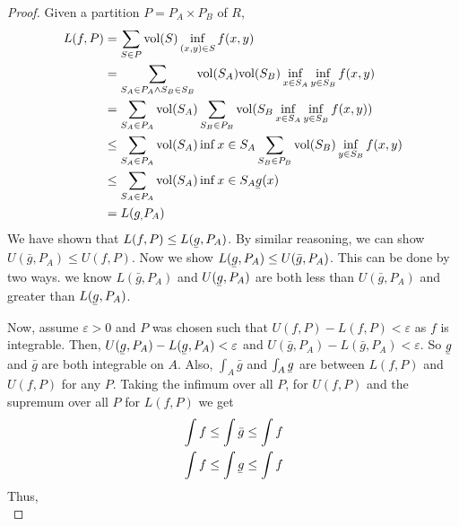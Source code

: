 \documentclass[a4paper]{article}
\newcommand{\ubar}[1]{\underaccent{\bar}{#1}}
\numberwithin{equation}{section}
\newcommand{\vol}{\mathrm{vol}}
\begin{document}
\begin{theorem}[Fubini's]
\begin{proof}
        Given a partition $P=P_A\times P_B$ of $R$,
        \begin{align}
            L(f,P)&=\sum_{S\in P}\vol(S)\inf_{(x,y)\in S}f(x,y)\\
            &=\sum_{S_A\in P_A\land S_B\in S_B} \vol(S_A)\vol(S_B)\inf_{x\in S_A} \inf_{y\in S_B} f(x,y)\\
            &=\sum_{S_A\in P_A}\vol(S_A)\sum_{S_B\in P_B}\vol(S_B\inf_{x\in S_A} \inf_{y\in S_B} f(x,y))\\
            &\leq\sum_{S_A\in P_A}\vol(S_A)\inf{x\in S_A}\sum_{S_B\in P_B}\vol(S_B)\inf_{y\in S_B} f(x,y)\\
            &\leq\sum_{S_A\in P_A}\vol(S_A)\inf{x\in S_A}\ubar{g}(x)\\
            &=L(g_,P_A)
        \end{align}
        We have shown that $L(f,P)\leq L(\ubar{g},P_A)$. By similar reasoning, we can show $U(\bar{g},P_A)\leq U(f,P)$. Now we show $L(\ubar{g},P_A)\leq U(\bar{g},P_A)$. This can be done by two ways. we know $L(\bar{g},P_A)$ and $U(\ubar{g},P_A)$ are both less than $U(\bar{g},P_A)$ and greater than $L(\ubar{g},P_A)$. 

        Now, assume $\varepsilon>0$ and $P$ was chosen such that $U(f,P)-L(f,P)<\varepsilon$ as $f$ is integrable. Then, $U(\ubar{g},P_A)-L(\ubar{g},P_A)<\varepsilon$ and $U(\bar{g},P_A)-L(\bar{g},P_A)<\varepsilon$. So $\ubar{g}$ and $\bar{g}$ are both integrable on $A$. Also, $\int_A\bar{g}$ and $\int_A\ubar{g}$ are between $L(f,P)$ and $U(f,P)$ for any $P$. Taking the infimum over all $P$, for $U(f,P)$ and the supremum over all $P$ for $L(f,P)$ we get 
        \begin{align}
            &\int f\leq \int \bar{g}\leq \int f\\
            &\int f\leq \int\ubar{g}\leq \int f
        \end{align}
        Thus, 
        \begin{equation}
            
        \end{equation}
    \end{proof}
\end{theorem}
\end{document}
